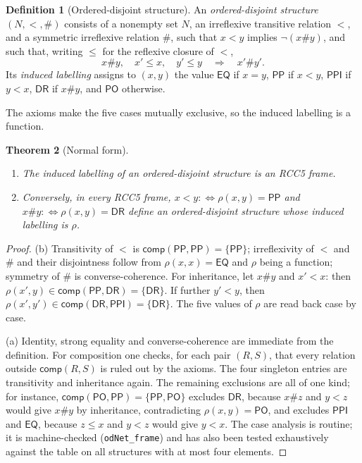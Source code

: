 \documentclass[11pt]{article}
\newcommand{\DR}{\mathsf{DR}}
\newcommand{\PO}{\mathsf{PO}}
\newcommand{\PP}{\mathsf{PP}}
\newcommand{\PPI}{\mathsf{PPI}}
\newcommand{\EQ}{\mathsf{EQ}}
\newcommand{\comp}{\mathsf{comp}}
\newcommand{\code}[1]{\texttt{#1}}
\theoremstyle{plain}
\newtheorem{theorem}{Theorem}[section]
\theoremstyle{definition}
\newtheorem{definition}[theorem]{Definition}
\begin{document}
\begin{definition}[Ordered-disjoint structure]\label{def:od}
An \emph{ordered-disjoint structure} $(N,<,\#)$ consists of a nonempty set $N$,
an irreflexive transitive relation $<$, and a symmetric irreflexive relation
$\#$, such that $x<y$ implies $\neg(x\#y)$, and such that, writing $\le$ for
the reflexive closure of $<$,
\[
  x\#y,\quad x'\le x,\quad y'\le y \quad\Longrightarrow\quad x'\#y'.
\]
Its \emph{induced labelling} assigns to $(x,y)$ the value $\EQ$ if $x=y$, $\PP$
if $x<y$, $\PPI$ if $y<x$, $\DR$ if $x\#y$, and $\PO$ otherwise.
\end{definition}

The axioms make the five cases mutually exclusive, so the induced labelling is
a function.

\begin{theorem}[Normal form]\label{thm:nf}
\begin{enumerate}
  \item[(a)] The induced labelling of an ordered-disjoint structure is an RCC5
    frame.
  \item[(b)] Conversely, in every RCC5 frame, $x<y :\!\iff \rho(x,y)=\PP$ and
    $x\#y :\!\iff \rho(x,y)=\DR$ define an ordered-disjoint structure whose
    induced labelling is $\rho$.
\end{enumerate}
\end{theorem}

\begin{proof}
(b) Transitivity of $<$ is $\comp(\PP,\PP)=\{\PP\}$; irreflexivity of $<$ and
$\#$ and their disjointness follow from $\rho(x,x)=\EQ$ and $\rho$ being a
function; symmetry of $\#$ is converse-coherence. For inheritance, let $x\#y$
and $x'<x$: then $\rho(x',y)\in\comp(\PP,\DR)=\{\DR\}$. If further $y'<y$, then
$\rho(x',y')\in\comp(\DR,\PPI)=\{\DR\}$. The five values of $\rho$ are read back
case by case.

(a) Identity, strong equality and converse-coherence are immediate from the
definition. For composition one checks, for each pair $(R,S)$, that every
relation outside $\comp(R,S)$ is ruled out by the axioms. The four singleton
entries are transitivity and inheritance again. The remaining exclusions are
all of one kind; for instance, $\comp(\PO,\PP)=\{\PP,\PO\}$ excludes $\DR$,
because $x\#z$ and $y<z$ would give $x\#y$ by inheritance, contradicting
$\rho(x,y)=\PO$, and excludes $\PPI$ and $\EQ$, because $z\le x$ and $y<z$ would
give $y<x$. The case analysis is routine; it is machine-checked
(\code{odNet\_frame}) and has also been tested exhaustively against the table
on all structures with at most four elements.
\end{proof}
\end{document}
